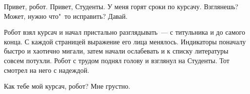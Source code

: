 \begin{dialog}
\X Привет, робот.
\R Привет, Студенты.
\X У меня горят сроки по курсачу. Взглянешь? Может, нужно что"~то исправить?
\R Давай.
\end{dialog}

\begin{monolog}
Робот взял курсач и начал пристально разглядывать~--- с титульника и до самого конца. С каждой страницей выражение его лица менялось. Индикаторы поначалу быстро и хаотично мигали, затем начали ослабевать и к списку литературы совсем потухли. Робот с трудом поднял голову и взглянул на Студенты. Тот смотрел на него с надеждой.
\end{monolog}

\begin{dialog}
\X Как тебе мой курсач, робот?
\R Мне грустно.
\end{dialog}